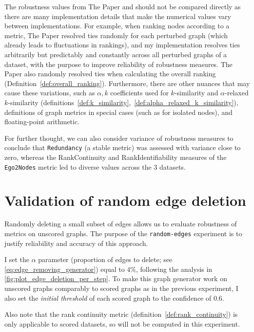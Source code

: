 The robustness values from The Paper and \graffs should not be compared directly as there are many implementation details that make the numerical values vary between implementations.
For example, when ranking nodes according to a metric, The Paper resolved ties randomly for each perturbed graph (which already leads to fluctuations in rankings), and my implementation resolves ties arbitrarily but predictably and constantly across all perturbed graphs of a dataset, with the purpose to improve reliability of robustness measures.
The Paper also randomly resolved ties when calculating the overall ranking (Definition~\ref{def:overall_ranking}).
Furthermore, there are other nuances that may cause these variations, such as $\alpha,k$ coefficients used for $k$-similarity and $\alpha$-relaxed $k$-similarity (definitions~\ref{def:k_similarity},~\ref{def:alpha_relaxed_k_similarity}), definitions of graph metrics in special cases (such as for isolated nodes), and floating-point arithmetic.

For further thought, we can also consider variance of robustness measures to conclude that \texttt{Redundancy} (a stable metric) was assessed with variance close to zero, whereas the RankContinuity and RankIdentifiability measures of the \texttt{Ego2Nodes} metric led to diverse values across the 3 datasets.



\section{Validation of random edge deletion}

Randomly deleting a small subset of edges allows us to evaluate robustness of metrics on unscored graphs.
The purpose of the \texttt{random-edges} experiment is to justify reliability and accuracy of this approach.



I set the $\alpha$ parameter (proportion of edges to delete; see \autoref{eq:edge_removing_generator}) equal to $4\%$, following the analysis in \autoref{fig:plot_edge_deletion_per_step}.
To make this graph generator work on unscored graphs comparably to scored graphs as in the previous experiment, I also set the \textsl{initial threshold} of each scored graph to the confidence of $0.6$.

Also note that the rank continuity metric (definition~\ref{def:rank_continuity}) is only applicable to scored datasets, so will not be computed in this experiment.

